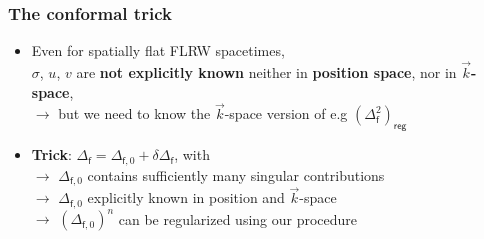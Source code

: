 \documentclass[9pt]{beamer}
\newcommand{\fsf}{\mathsf{f}}
\begin{document}
\begin{frame}

\frametitle{The conformal trick} 

\begin{itemize}

\item \textdbend \quad Even for spatially flat FLRW spacetimes, \\
$\sigma$, $u$, $v$ are \textbf{not explicitly known} neither in \textbf{position space}, nor in \textbf{$\vec{k}$-space}, \\
$\to$ but we need to know the $\vec{k}$-space version of e.g $\left( \Delta^2_\fsf \right)_\mathsf{reg}$
\vspace*{20pt}

\item \textbf{Trick}: $\Delta_\fsf=\Delta_{\fsf,0}+\delta \Delta_\fsf$, with \\[3pt]

$\to$ $\Delta_{\fsf,0}$ contains sufficiently many singular contributions \\[3pt]

$\to$ $\Delta_{\fsf,0}$ explicitly known in position and $\vec{k}$-space \\[3pt]

$\to$ $(\Delta_{\fsf,0})^n$ can be regularized using our procedure

\end{itemize}

\end{frame}

\end{document}
